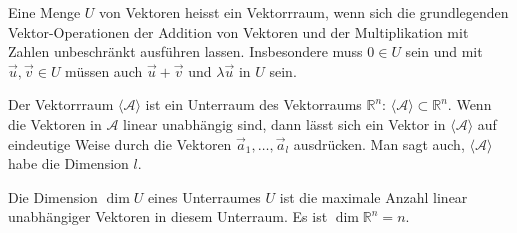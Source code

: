 \begin{definition}
Eine Menge $U$ von Vektoren heisst ein Vektorrraum, wenn
sich die grundlegenden Vektor-Operationen der Addition von Vektoren
und der Multiplikation mit Zahlen unbeschränkt ausführen lassen.
Insbesondere muss $0\in U$ sein und mit $\vec{u},\vec{v}\in U$ müssen
auch $\vec{u}+\vec{v}$ und $\lambda\vec{u}$ in $U$ sein.
\end{definition}
%
Der Vektorrraum $\langle\mathcal{A}\rangle$ ist
ein Unterraum des Vektorraums $\mathbb R^n$: $\langle\mathcal{A}\rangle
\subset\mathbb R^n$.
Wenn die Vektoren in $\mathcal{A}$ linear unabhängig sind, dann lässt
sich ein Vektor in $\langle\mathcal{A}\rangle$ auf eindeutige Weise
durch die Vektoren $\vec{a}_1,\dots,\vec{a}_l$ ausdrücken.
Man sagt auch, $\langle\mathcal{A}\rangle$ habe die Dimension $l$.

\begin{definition}
Die Dimension $\dim U$ eines Unterraumes $U$ ist die maximale Anzahl
linear unabhängiger Vektoren in diesem Unterraum.
Es ist $\dim\mathbb R^n=n$.
\end{definition}

